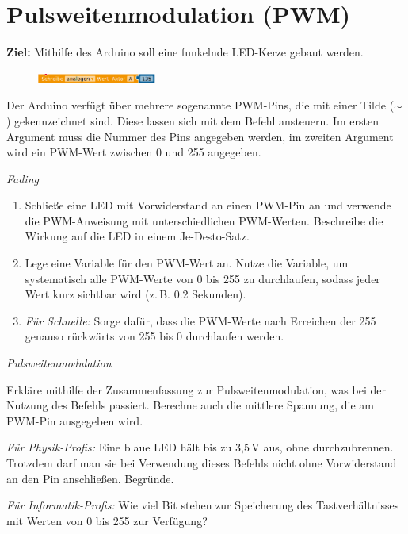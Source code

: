 \section{Pulsweitenmodulation (PWM)}\label{sec:pwm}

\begin{ziel}
	\textbf{Ziel:} Mithilfe des Arduino soll eine funkelnde LED-Kerze gebaut werden.
\end{ziel}

\begin{figure}
	\centering
	\includegraphics[width=0.35\textwidth]{./pics/analogwrite.png}
\end{figure}
Der Arduino verfügt über mehrere sogenannte PWM-Pins, die mit einer Tilde ($\sim$) gekennzeichnet sind. Diese lassen sich mit dem Befehl  ansteuern. Im ersten Argument muss die Nummer des Pins angegeben werden, im zweiten Argument wird ein PWM-Wert zwischen 0 und 255 angegeben.

\begin{aufgabe} \emph{Fading}
	\begin{enumerate}[label=\alph*), itemsep=0ex, parsep=0ex]
		\item Schließe eine LED mit Vorwiderstand an einen PWM-Pin an und verwende die PWM-Anweisung mit unterschiedlichen PWM-Werten. Beschreibe die Wirkung auf die LED in einem Je-Desto-Satz.
		\item Lege eine Variable  für den PWM-Wert an. Nutze die Variable, um systematisch alle PWM-Werte von 0 bis 255 zu durchlaufen, sodass jeder Wert kurz sichtbar wird (z.\,B. 0.2 Sekunden).
		\item \emph{Für Schnelle:} Sorge dafür, dass die PWM-Werte nach Erreichen der 255 genauso rückwärts von 255 bis 0 durchlaufen werden.
	\end{enumerate}
\end{aufgabe}

\begin{aufgabe} \emph{Pulsweitenmodulation}
	
	Erkläre mithilfe der Zusammenfassung zur Pulsweitenmodulation, was bei der Nutzung des Befehls  passiert. Berechne auch die mittlere Spannung, die am PWM-Pin ausgegeben wird.
	
	\emph{Für Physik-Profis:} Eine blaue LED hält bis zu 3,5\,V aus, ohne durchzubrennen. Trotzdem darf man sie bei Verwendung dieses Befehls nicht ohne Vorwiderstand an den Pin anschließen. Begründe.
	
	\emph{Für Informatik-Profis:} Wie viel Bit stehen zur Speicherung des Tastverhältnisses mit Werten von 0 bis 255 zur Verfügung?
\end{aufgabe}

